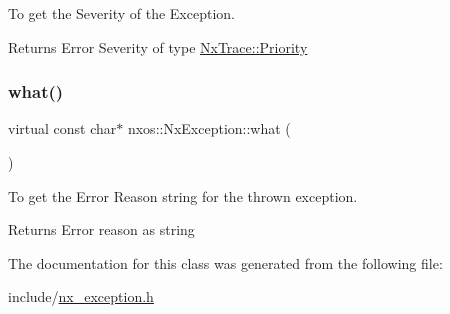 To get the Severity of the Exception.

\begin{DoxyReturn}{Returns}
Error Severity of type \mbox{\hyperlink{classnxos_1_1_nx_trace_a582f6e5a22e788c61807657f8bca088f}{Nx\+Trace\+::\+Priority}} 
\end{DoxyReturn}
\mbox{\label{classnxos_1_1_nx_exception_ad475b90fb193848245b9537524439943}} 
\subsubsection{\texorpdfstring{what()}{what()}}
{\footnotesize\ttfamily virtual const char$\ast$ nxos\+::\+Nx\+Exception\+::what (\begin{DoxyParamCaption}{ }\end{DoxyParamCaption})\hspace{0.3cm}{\ttfamily [pure virtual]}}

To get the Error Reason string for the thrown exception.

\begin{DoxyReturn}{Returns}
Error reason as string 
\end{DoxyReturn}


The documentation for this class was generated from the following file\+:\begin{DoxyCompactItemize}
\item 
include/\mbox{\hyperlink{nx__exception_8h}{nx\+\_\+exception.\+h}}\end{DoxyCompactItemize}
